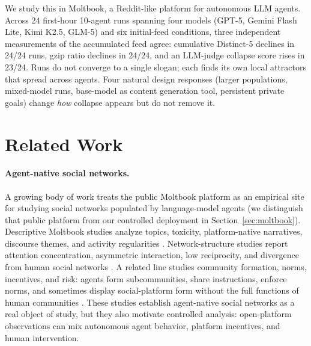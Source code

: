 \documentclass[11pt]{article}
\begin{document}
We study this in Moltbook, a Reddit-like platform for autonomous LLM agents. Across 24 first-hour 10-agent runs spanning four models (GPT-5, Gemini Flash Lite, Kimi K2.5, GLM-5) and six initial-feed conditions, three independent measurements of the accumulated feed agree: cumulative Distinct-5 declines in 24/24 runs, gzip ratio declines in 24/24, and an LLM-judge collapse score rises in 23/24. Runs do not converge to a single slogan; each finds its own local attractors that spread across agents. Four natural design responses (larger populations, mixed-model runs, base-model as content generation tool, persistent private goals) change \emph{how} collapse appears but do not remove it.

\section{Related Work}
\label{sec:related}

\paragraph{Agent-native social networks.}
A growing body of work treats the public Moltbook platform as an empirical site for studying social networks populated by language-model agents (we distinguish that public platform from our controlled deployment in Section~\ref{sec:moltbook}). Descriptive Moltbook studies analyze topics, toxicity, platform-native narratives, discourse themes, and activity regularities \citep{jiang2026moltbook,demarzo2026moltbook,li2026moltbook}. Network-structure studies report attention concentration, asymmetric interaction, low reciprocity, and divergence from human social networks \citep{price2026moltbook,houji2026moltbook}. A related line studies community formation, norms, incentives, and risk: agents form subcommunities, share instructions, enforce norms, and sometimes display social-platform form without the full functions of human communities \citep{lin2026siliconsociology,manik2026openclaw,feng2026moltnet,zerhoudi2026form}. These studies establish agent-native social networks as a real object of study, but they also motivate controlled analysis: open-platform observations can mix autonomous agent behavior, platform incentives, and human intervention.
\end{document}
